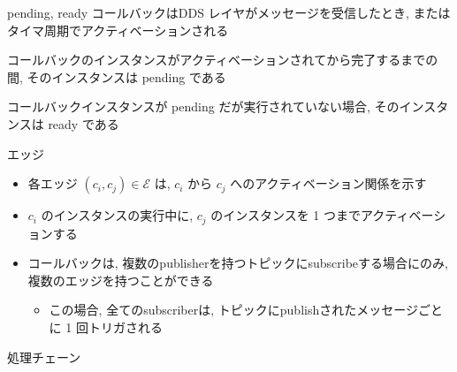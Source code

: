 \begin{frame}{pending, ready}
    コールバックはDDS レイヤがメッセージを受信したとき, またはタイマ周期でアクティベーションされる
    \begin{definition}[pending]
        コールバックのインスタンスがアクティベーションされてから完了するまでの間, そのインスタンスは pending である
    \end{definition}
    \begin{definition}[ready]
        コールバックインスタンスが pending だが実行されていない場合, そのインスタンスは ready である
    \end{definition}
\end{frame}

\begin{frame}{エッジ}
    \begin{itemize}
        \item 各エッジ $\left(c_{i}, c_{j}\right) \in \mathcal{E}$ は, $c_{i}$ から $c_{j}$ へのアクティベーション関係を示す
        \item $c_{i}$ のインスタンスの実行中に, $c_{j}$ のインスタンスを 1 つまでアクティベーションする
        \item コールバックは, 複数のpublisherを持つトピックにsubscribeする場合にのみ, 複数のエッジを持つことができる
        \begin{itemize}
            \item この場合, 全てのsubscriberは, トピックにpublishされたメッセージごとに 1 回トリガされる
        \end{itemize}
    \end{itemize}
\end{frame}

\begin{frame}{処理チェーン}
\end{frame}

